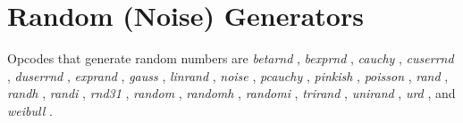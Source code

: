 \begin{comment}
\documentclass[10pt]{article}
\usepackage{fullpage, graphicx, url}
\setlength{\parskip}{1ex}
\setlength{\parindent}{0ex}
\title{Random (Noise) Generators}



\begin{tabular}{ccc}
The Alternative Csound Reference Manual & & \\
Previous &Signal Generators &Next

\end{tabular}

\end{comment}
\section{Random (Noise) Generators}


  Opcodes that generate random numbers are \emph{betarnd}
, \emph{bexprnd}
, \emph{cauchy}
, \emph{cuserrnd}
, \emph{duserrnd}
, \emph{exprand}
, \emph{gauss}
, \emph{linrand}
, \emph{noise}
, \emph{pcauchy}
, \emph{pinkish}
, \emph{poisson}
, \emph{rand}
, \emph{randh}
, \emph{randi}
, \emph{rnd31}
, \emph{random}
, \emph{randomh}
, \emph{randomi}
, \emph{trirand}
, \emph{unirand}
, \emph{urd}
, and \emph{weibull}
. 


\begin{comment}
\begin{tabular}{lcr}
Previous &Home &Next \\
Phasors &Up &Sample Playback

\end{tabular}



\end{comment}
